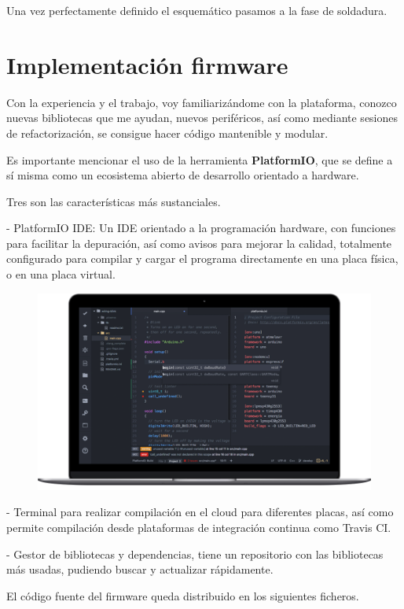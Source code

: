 Una vez perfectamente definido el esquemático pasamos a la fase de soldadura.


\newpage

\section{Implementación firmware}


Con la experiencia y el trabajo, voy familiarizándome con la plataforma, conozco nuevas bibliotecas que me ayudan, nuevos periféricos,  así como mediante sesiones de refactorización, se consigue hacer código mantenible y modular. 

Es importante mencionar el uso de la herramienta \textbf{PlatformIO}, que se define a sí misma como un ecosistema abierto de desarrollo orientado a hardware. 


Tres son las características más sustanciales. 


- PlatformIO IDE: Un IDE orientado a la programación hardware, con funciones para facilitar la depuración, así como avisos para mejorar la calidad, totalmente configurado para compilar y cargar el programa directamente en una placa física, o en una placa virtual.

\begin{figure}
	\centering
	\includegraphics[width=0.7\linewidth]{../images/ide_arduino}
	\caption{}
	\label{fig:ide_arduino}
\end{figure}

- Terminal para realizar compilación en el cloud  para diferentes placas, así como permite compilación desde plataformas de integración continua como Travis CI.

- Gestor de bibliotecas y dependencias, tiene un repositorio con las bibliotecas más usadas, pudiendo buscar y actualizar rápidamente. 



El código fuente del firmware queda distribuido en los siguientes ficheros.

